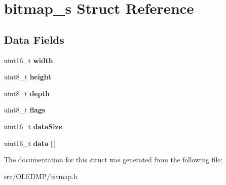 \hypertarget{structbitmap__s}{\section{bitmap\+\_\+s Struct Reference}
\label{structbitmap__s}
}
\subsection*{Data Fields}
\begin{DoxyCompactItemize}
\item 
\hypertarget{structbitmap__s_ad0eab1042455a2067c812ab8071d5376}{uint16\+\_\+t {\bfseries width}}\label{structbitmap__s_ad0eab1042455a2067c812ab8071d5376}

\item 
\hypertarget{structbitmap__s_adcf201a8aabf55cb352ec05331242594}{uint8\+\_\+t {\bfseries height}}\label{structbitmap__s_adcf201a8aabf55cb352ec05331242594}

\item 
\hypertarget{structbitmap__s_ab6f276082172be43a6041212071e377b}{uint8\+\_\+t {\bfseries depth}}\label{structbitmap__s_ab6f276082172be43a6041212071e377b}

\item 
\hypertarget{structbitmap__s_aa2585d779da0ab21273a8d92de9a0ebe}{uint8\+\_\+t {\bfseries flags}}\label{structbitmap__s_aa2585d779da0ab21273a8d92de9a0ebe}

\item 
\hypertarget{structbitmap__s_afe5dbe9ff0f4a3d528fdd0697ad730eb}{uint16\+\_\+t {\bfseries data\+Size}}\label{structbitmap__s_afe5dbe9ff0f4a3d528fdd0697ad730eb}

\item 
\hypertarget{structbitmap__s_a150379680c51ad51c2ffc0c53c051d9f}{uint16\+\_\+t {\bfseries data} \mbox{[}$\,$\mbox{]}}\label{structbitmap__s_a150379680c51ad51c2ffc0c53c051d9f}

\end{DoxyCompactItemize}


The documentation for this struct was generated from the following file\+:\begin{DoxyCompactItemize}
\item 
src/\+O\+L\+E\+D\+M\+P/bitmap.\+h\end{DoxyCompactItemize}
